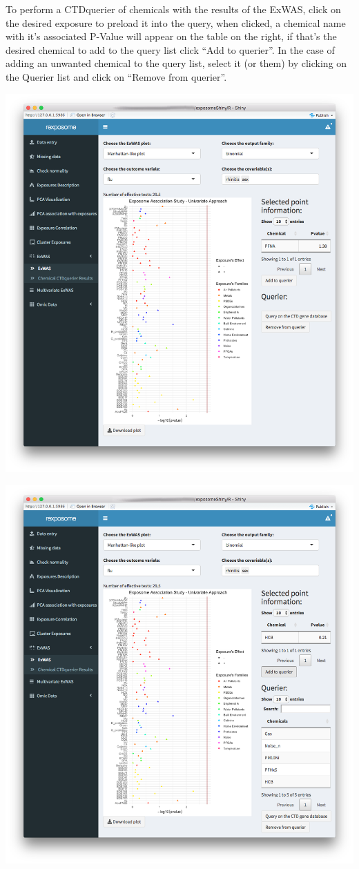 \documentclass[
]{book}
\begin{document}
To perform a CTDquerier of chemicals with the results of the ExWAS, click on the desired exposure to preload it into the query, when clicked, a chemical name with it's associated P-Value will appear on the table on the right, if that's the desired chemical to add to the query list click ``Add to querier''. In the case of adding an unwanted chemical to the query list, select it (or them) by clicking on the Querier list and click on ``Remove from querier''.

\includegraphics{images/analysis7_4.png}

\includegraphics{images/analysis7_5.png}
\end{document}
